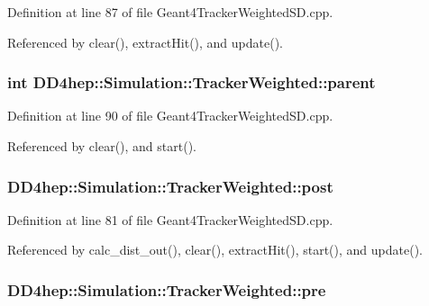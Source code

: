 Definition at line 87 of file Geant4TrackerWeightedSD.cpp.

Referenced by clear(), extractHit(), and update().\hypertarget{struct_d_d4hep_1_1_simulation_1_1_tracker_weighted_a8fcddaa426fa0d7a901991856f3f4d1a}{
\subsubsection[{parent}]{\setlength{\rightskip}{0pt plus 5cm}int {\bf DD4hep::Simulation::TrackerWeighted::parent}}}
\label{struct_d_d4hep_1_1_simulation_1_1_tracker_weighted_a8fcddaa426fa0d7a901991856f3f4d1a}


Definition at line 90 of file Geant4TrackerWeightedSD.cpp.

Referenced by clear(), and start().\hypertarget{struct_d_d4hep_1_1_simulation_1_1_tracker_weighted_af821b8459359ddcb2713bf34f1d72949}{
\subsubsection[{post}]{ {\bf DD4hep::Simulation::TrackerWeighted::post}}}
\label{struct_d_d4hep_1_1_simulation_1_1_tracker_weighted_af821b8459359ddcb2713bf34f1d72949}


Definition at line 81 of file Geant4TrackerWeightedSD.cpp.

Referenced by calc\_\-dist\_\-out(), clear(), extractHit(), start(), and update().\hypertarget{struct_d_d4hep_1_1_simulation_1_1_tracker_weighted_a3bb8dbd97551f655071ce36e357593ef}{
\subsubsection[{pre}]{ {\bf DD4hep::Simulation::TrackerWeighted::pre}}}
\label{struct_d_d4hep_1_1_simulation_1_1_tracker_weighted_a3bb8dbd97551f655071ce36e357593ef}


